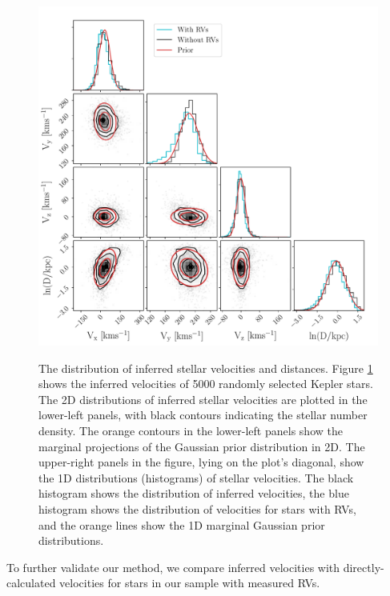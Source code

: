 
\begin{figure}[ht!]
\caption{
The distribution of inferred stellar velocities and distances.
    Figure \ref{fig:results} shows the inferred velocities of 5000 randomly
selected Kepler stars.
The 2D distributions of inferred stellar velocities are plotted in the
lower-left panels, with black contours indicating the stellar number density.
The orange contours in the lower-left panels show the marginal projections of
    the Gaussian prior distribution in 2D.
The upper-right panels in the figure, lying on the plot's diagonal, show the
    1D distributions (histograms) of stellar velocities.
The black histogram shows the distribution of inferred velocities, the blue
histogram shows the distribution of velocities for stars with RVs,
and the orange lines show the 1D marginal Gaussian prior distributions.
}
  \centering
    \includegraphics[width=.7\textwidth]{results}
\label{fig:results}
\end{figure}
To further validate our method, we compare inferred velocities with
directly-calculated velocities for stars in our sample with measured RVs.
